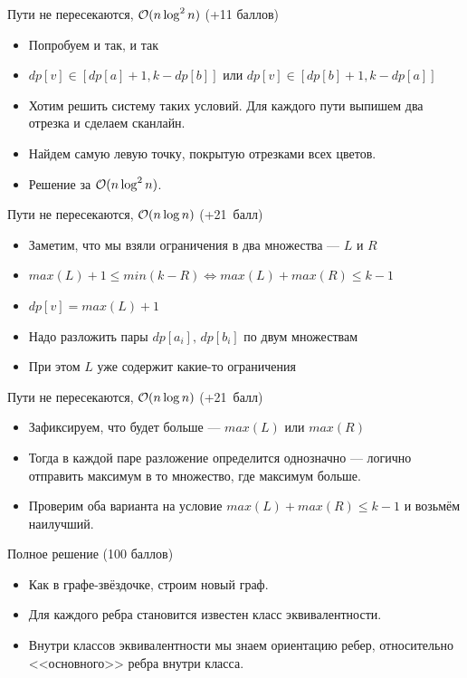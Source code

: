 \begin{frame}{Пути не пересекаются, $\mathcal{O}(n \log^2 n)$ (+11 баллов)}
  \begin{itemize}
    \item Попробуем и так, и так
    \item $dp[v] \in [dp[a] + 1, k - dp[b]]$ или $dp[v] \in [dp[b] + 1, k - dp[a]]$
    \item Хотим решить систему таких условий. Для каждого пути выпишем два отрезка и сделаем сканлайн.
    \item Найдем самую левую точку, покрытую отрезками всех цветов.
    \item Решение за $\mathcal{O}(n \log^2 n)$.
  \end{itemize}
\end{frame}

\begin{frame}{Пути не пересекаются, $\mathcal{O}(n \log n)$ (+21~балл)}
  \begin{itemize}
    \item Заметим, что мы взяли ограничения в два множества --- $L$ и $R$
    \item $max(L) + 1 \le min(k - R) \iff max(L) + max(R) \le k - 1$
    \item $dp[v] = max(L) + 1$
    \item Надо разложить пары $dp[a_i],\,dp[b_i]$ по двум множествам
    \item При этом $L$ уже содержит какие-то ограничения
  \end{itemize}
\end{frame}

\begin{frame}{Пути не пересекаются, $\mathcal{O}(n \log n)$ (+21~балл)}
  \begin{itemize}
    \item Зафиксируем, что будет больше --- $max(L)$ или $max(R)$
    \item Тогда в каждой паре разложение определится однозначно --- логично отправить максимум в то множество, где максимум больше.
    \item Проверим оба варианта на условие $max(L) + max(R) \le k - 1$ и возьмём наилучший.
  \end{itemize}
\end{frame}

\begin{frame}{Полное решение (100 баллов)}
  \begin{itemize}
    \item Как в графе-звёздочке, строим новый граф.
    \item Для каждого ребра становится известен класс эквивалентности.
    \item Внутри классов эквивалентности мы знаем ориентацию ребер, относительно <<основного>> ребра внутри класса.
  \end{itemize}
\end{frame}

